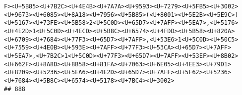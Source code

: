 \documentclass[
]{article}
\begin{document}
\begin{verbatim}
F><U+5B85><U+7B2C><U+4E4B><U+7A7A><U+9593><U+7279><U+5FB5><U+3002><U+9673><U+6085><U+8A18><U+7956><U+5B85>(<U+8001><U+5E2B><U+5E9C>)<U+5167><U+73FE><U+5B58>2<U+5C0D><U+65D7><U+7AFF><U+5EA7>,<U+5176><U+4E2D>1<U+5C0D><U+4ECD><U+5B8C><U+6574><U+4FDD><U+5B58><U+820A><U+6709><U+7684><U+77F3><U+65D7><U+7AFF>,<U+53E6>1<U+5C0D><U+50C5><U+7559><U+4E0B><U+593E><U+7AFF><U+77F3><U+53CA><U+65D7><U+7AFF><U+5EA7>,<U+7B2C>1<U+5C0D><U+77F3><U+65D7><U+7AFF><U+53EF><U+8B02><U+662F><U+8A8D><U+8B58><U+81FA><U+7063><U+6E05><U+4EE3><U+79D1><U+8209><U+5236><U+5EA6><U+4E2D><U+65D7><U+7AFF><U+5F62><U+5236><U+7684><U+5B8C><U+6574><U+5178><U+7BC4><U+3002>
## 888                                                                                                                                                                                                                                                                                                                                                                                                                                                                                                                                                                                                                                                                                                                                                                                                                                                                                                                                                                                                                                                                                                                                                                                                                                                                                                                                                                                                                                                                                                                                                                                                                                                                                                                                                                                                                                                                                                                                                                                                                                                                                                                                                                                                                                                                                                                                                                                                                                                                                                                                                                                                                                                                                                                                                                                     
\end{verbatim}
\end{document}
